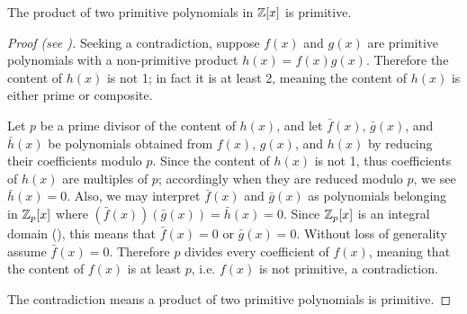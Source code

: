 \begin{lemma}[Gauss]\label{lemma-gauss-for-integer-coefficients}
    The product of two primitive polynomials in $\mathbb{Z}[x]$ is primitive.
\end{lemma}
\begin{proof}[Proof (see {\cite[p.~291]{gallian_2016}})]
    Seeking a contradiction, suppose $f(x)$ and $g(x)$ are primitive polynomials with a non-primitive product $h(x) = f(x)g(x)$. Therefore the content of $h(x)$ is not 1; in fact it is at least 2, meaning the content of $h(x)$ is either prime or composite.

    Let $p$ be a prime divisor of the content of $h(x)$, and let $\bar{f}(x)$, $\bar{g}(x)$, and $\bar{h}(x)$ be polynomials obtained from $f(x)$, $g(x)$, and $h(x)$ by reducing their coefficients modulo $p$. Since the content of $h(x)$ is not 1, thus coefficients of $h(x)$ are multiples of $p$; accordingly when they are reduced modulo $p$, we see $\bar{h}(x) = 0$. Also, we may interpret $\bar{f}(x)$ and $\bar{g}(x)$ as polynomials belonging in $\mathbb{Z}_p[x]$ where $(\bar{f}(x))(\bar{g}(x)) = \bar{h}(x) = 0$. Since $\mathbb{Z}_p[x]$ is an integral domain (), this means that $\bar{f}(x) = 0$ or $\bar{g}(x) = 0$. Without loss of generality assume $\bar{f}(x) = 0$. Therefore $p$ divides every coefficient of $f(x)$, meaning that the content of $f(x)$ is at least $p$, i.e. $f(x)$ is not primitive, a contradiction.

    The contradiction means a product of two primitive polynomials is primitive.
\end{proof}

